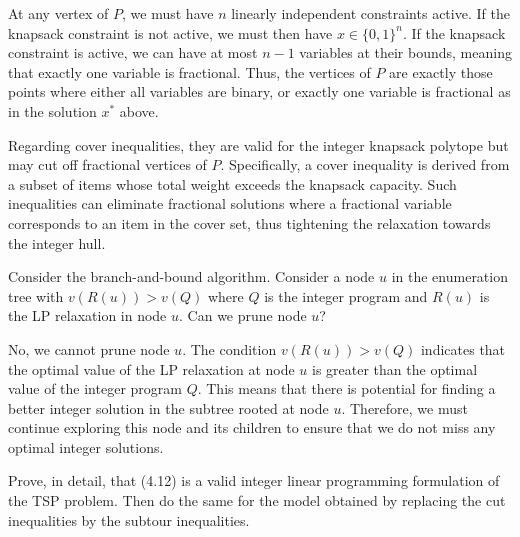 \begin{solution}
  At any vertex of $P$, we must have $n$ linearly independent constraints active.
  If the knapsack constraint is not active, we must then have $x \in \{0, 1\}^n$.
  If the knapsack constraint is active, we can have at most $n - 1$ variables at their bounds, meaning that exactly one variable is fractional.
  Thus, the vertices of $P$ are exactly those points where either all variables are binary, or exactly one variable is fractional as in the solution $x^*$ above.

  Regarding cover inequalities, they are valid for the integer knapsack polytope but may cut off fractional vertices of $P$.
  Specifically, a cover inequality is derived from a subset of items whose total weight exceeds the knapsack capacity.
  Such inequalities can eliminate fractional solutions where a fractional variable corresponds to an item in the cover set, thus tightening the relaxation towards the integer hull.
\end{solution}

\begin{exercise}
  Consider the branch-and-bound algorithm.
  Consider a node $u$ in the enumeration tree with $v(R(u)) > v(Q)$ where $Q$ is the integer program and $R(u)$ is the LP relaxation in node $u$.
  Can we prune node $u$?
\end{exercise}

\begin{solution}
  No, we cannot prune node $u$.
  The condition $v(R(u)) > v(Q)$ indicates that the optimal value of the LP relaxation at node $u$ is greater than the optimal value of the integer program $Q$.
  This means that there is potential for finding a better integer solution in the subtree rooted at node $u$.
  Therefore, we must continue exploring this node and its children to ensure that we do not miss any optimal integer solutions.
\end{solution}

\begin{exercise}
  Prove, in detail, that (4.12) is a valid integer linear programming formulation of the TSP problem.
  Then do the same for the model obtained by replacing the cut inequalities by the subtour inequalities.
\end{exercise}

